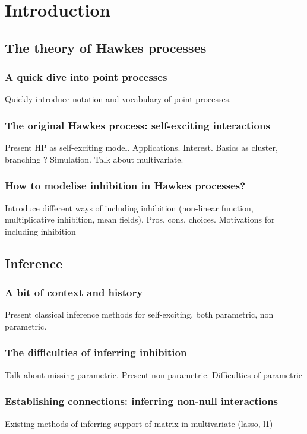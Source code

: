 \chapter{Introduction}

\section{The theory of Hawkes processes}
    \subsection{A quick dive into point processes}
        Quickly introduce notation and vocabulary of point processes.
    \subsection{The original Hawkes process: self-exciting interactions}
        Present HP as self-exciting model. Applications. Interest.
        Basics as cluster, branching ? 
        Simulation.
        Talk about multivariate.
    \subsection{How to modelise inhibition in Hawkes processes?}
        Introduce different ways of including inhibition (non-linear function, multiplicative inhibition, mean fields).
            Pros, cons, choices.
        Motivations for including inhibition

\section{Inference}
    \subsection{A bit of context and history}
        Present classical inference methods for self-exciting, both parametric, non parametric.
    \subsection{The difficulties of inferring inhibition}
        Talk about missing parametric. Present non-parametric.
        Difficulties of parametric
    \subsection{Establishing connections: inferring non-null interactions}
        Existing methods of inferring support of matrix in multivariate (lasso, l1) %
